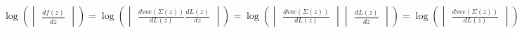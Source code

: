 \documentclass[11pt]{article}
\begin{document}
\[\log(\begin{vmatrix} \frac{d f(z)}{dz} \end{vmatrix}) = \log(\begin{vmatrix} \frac{d \text{vec}(\Sigma(z))}{dL(z)} \frac{dL(z)}{dz} \end{vmatrix}) = \log(\begin{vmatrix} \frac{d \text{vec}(\Sigma(z))}{dL(z)} \end{vmatrix} \begin{vmatrix} \frac{dL(z)}{dz} \end{vmatrix}) =  \log(\begin{vmatrix} \frac{d \text{vec}(\Sigma(z))}{dL(z)} \end{vmatrix}) + \log( \begin{vmatrix} \frac{dL(z)}{dz} \end{vmatrix}) \]



\end{document}
